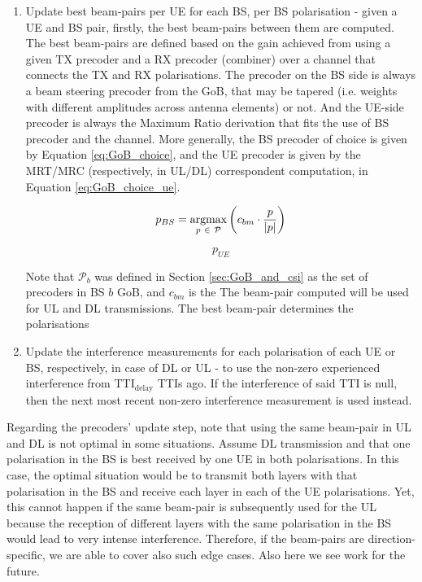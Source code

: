 \begin{enumerate}
    \item Update best beam-pairs per UE for each BS, per BS polarisation - given a UE and BS pair, firstly, the best beam-pairs between them are computed. The best beam-pairs are defined based on the gain achieved from using a given TX precoder and a RX precoder (combiner) over a channel that connects the TX and RX polarisations. The precoder on the BS side is always a beam steering precoder from the GoB, that may be tapered (i.e. weights with different amplitudes across antenna elements) or not. And the UE-side precoder is always the Maximum Ratio derivation that fits the use of BS precoder and the channel. More generally, the BS precoder of choice is given by Equation \eqref{eq:GoB_choice}, and the UE precoder is given by the MRT/MRC (respectively, in UL/DL) correspondent computation, in Equation \ref{eq:GoB_choice_ue}.
    
    \begin{equation} \label{eq:GoB_choice}
        p_{BS} = \operatorname*{argmax}_{p \ \in \ \mathcal{P}} \left(c_{b m} \cdot \frac{p}{|p|} \right)
    \end{equation}
    
    \begin{equation} \label{eq:GoB_choice_ue}
        p_{UE}
    \end{equation}

    Note that $\mathcal{P}_b$ was defined in Section \ref{sec:GoB_and_csi} as the set of precoders in BS $b$ \ac{GoB}, and $c_{bm}$ is the
    The beam-pair computed will be used for UL and DL transmissions.
    The best beam-pair determines the polarisations
    \item Update the interference measurements for each polarisation of each UE or BS, respectively, in case of DL or UL - to use the non-zero experienced interference from $\text{TTI}_\text{delay}$ TTIs ago. If the interference of said TTI is null, then the next most recent non-zero interference measurement is used instead.
\end{enumerate}

Regarding the precoders' update step, note that using the same beam-pair in UL and DL is not optimal in some situations. Assume DL transmission and that one polarisation in the BS is best received by one UE in both polarisations. In this case, the optimal situation would be to transmit both layers with that polarisation in the BS and receive each layer in each of the UE polarisations. Yet, this cannot happen if the same beam-pair is subsequently used for the UL because the reception of different layers with the same polarisation in the BS would lead to very intense interference. Therefore, if the beam-pairs are direction-specific, we are able to cover also such edge cases. Also here we see work for the future.


